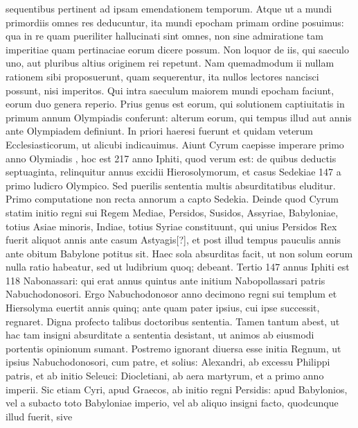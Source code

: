 sequentibus pertinent ad ipsam emendationem temporum.
Atque
ut a mundi primordiis omnes res deducuntur, ita mundi epocham
primam ordine posuimus: qua in re quam pueriliter hallucinati sint
omnes, non sine admiratione tam imperitiae quam pertinaciae eorum
dicere possum.
Non loquor de iis, qui saeculo uno, aut pluribus altius
originem rei repetunt.
Nam quemadmodum ii nullam rationem
sibi proposuerunt, quam sequerentur, ita nullos lectores nancisci
possunt, nisi imperitos. 
Qui intra saeculum maiorem mundi
epocham faciunt, eorum duo genera reperio.
Prius genus est eorum,
qui solutionem captiuitatis in primum annum Olympiadis  conferunt:
alterum eorum, qui tempus illud  aut  annis ante
 Olympiadem definiunt.
In priori haeresi fuerunt et
quidam veterum Ecclesiasticorum, ut alicubi indicauimus. 
Aiunt
Cyrum caepisse imperare primo anno Olymiadis , hoc est 217
anno Iphiti, quod verum est: de quibus deductis septuaginta, relinquitur
annus excidii Hierosolymorum, et casus Sedekiae 147 a primo ludicro
Olympico.
Sed puerilis sententia multis absurditatibus eluditur.
Primo computatione non recta annorum  a capto Sedekia.
Deinde quod Cyrum statim initio regni sui Regem Mediae, Persidos,
Susidos, Assyriae, Babyloniae, totius Asiae minoris, Indiae, totius
Syriae constituunt, qui unius Persidos Rex fuerit aliquot annis ante
casum Astyagis[?], et post illud tempus pauculis annis ante obitum
Babylone potitus sit.
Haec sola absurditas facit, ut non solum eorum
nulla ratio habeatur, sed ut ludibrium quoq; debeant.
Tertio 147 annus
Iphiti est 118 Nabonassari: qui erat annus quintus ante initium Nabopollassari
patris Nabuchodonosori.
Ergo Nabuchodonosor anno
decimono regni sui templum et Hiersolyma euertit annis quinq;
ante quam pater ipsius, cui ipse successit, regnaret.
%
Digna profecto
talibus doctoribus sententia.
Tamen tantum abest, ut hac tam insigni
absurditate a sententia desistant, ut animos ab eiusmodi portentis
opinionum sumant.
Postremo ignorant diuersa esse initia Regnum,
ut ipsius Nabuchodonosori, cum patre, et solius: Alexandri,
ab excessu Philippi patris, et ab initio Seleuci: Diocletiani, ab aera
martyrum, et a primo anno imperii.
Sic etiam Cyri, apud Graecos, ab
initio regni Persidis: apud Babylonios, vel a subacto toto Babyloniae
imperio, vel ab aliquo insigni facto, quodcunque illud fuerit, sive

